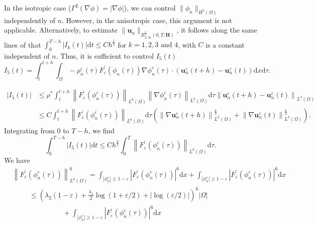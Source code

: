 \documentclass[11pt]{article}
\def\bfH{\mathbf{H}}
\def\bfu{\mathbf{u}}
\def\md{\mathrm{d}}
\def\Om{\Omega}
\begin{document}
In the isotropic case ($\Gamma^2(\nabla\phi) = |\nabla\phi|$), we can control $\|\phi_n^{}\|_{H^2(\Omega)}$ independently of $n$. However, in the anisotropic case, this argument is not applicable. Alternatively, to estimate $\|\bfu_n^{}\|_{B_{2,\infty}^{\frac{1}{4}}(0,T;\bfH)}$,
it follows along the same lines of \cite[page 210]{giorgini2020weak}  that 
$\int_{0}^{T-h} |I_k(t)| \md t \leq C h^{\frac{1}{2}}$ for $k=1,2,3\text{ and } 4$, with $C$ is a constant independent of $n$. Thus, it is sufficient to control $I_5(t)$
$$
I_5(t) = \int_t^{t+h} \int_{\Omega}-\rho_n^{\varepsilon}(\tau) F_{\varepsilon}^{\prime}\left(\phi_n(\tau)\right) \nabla \phi_n^{\varepsilon}(\tau) \cdot\left(\bfu^{\varepsilon}_n(t+h)-\bfu^{\varepsilon}_n(t)\right) \md x \md \tau.$$

$$
\begin{aligned}
\left|I_5(t)\right| & \leq \rho^* \int_t^{t+h}\left\|F_{\varepsilon}^{\prime}\left(\phi_n^{\varepsilon}(\tau)\right)\right\|_{L^6(\Omega)}\left\|\nabla \phi_n^{\varepsilon}(\tau)\right\|_{L^2(\Omega)} \md \tau\left\|\bfu^{\varepsilon}_n(t+h)-\bfu^{\varepsilon}_n(t)\right\|_{L^3(\Omega)} \\
& \leq C\int_t^{t+h}\left\|F_{\varepsilon}^{\prime}\left(\phi_n^{\varepsilon}(\tau)\right)\right\|_{L^6(\Omega)} \mathrm{d} \tau\left(\left\|\nabla \bfu^{\varepsilon}_n(t+h)\right\|_{L^2(\Omega)}^{\frac{1}{2}}+\left\|\nabla \bfu^{\varepsilon}_n(t)\right\|_{L^2(\Omega)}^{\frac{1}{2}}\right) .
\end{aligned}
$$
Integrating from $0$ to $T-h$, we find
$$
\int_0^{T-h}\left|I_5(t)\right| \mathrm{d} t \leq C h^{\frac{3}{4}} \int_0^T\left\|F_{\varepsilon}^{\prime}\left(\phi_n^{\varepsilon}(\tau)\right)\right\|_{L^6(\Omega)} \mathrm{d} \tau.
$$
We have 
\begin{align*}
&\left\|F_{\varepsilon}^{\prime}\left(\phi_n^{\varepsilon}(\tau)\right)\right\|^6_{L^6(\Omega)} = \int_{|\phi_n^{\varepsilon}|\leq 1-\varepsilon}|F_{\varepsilon}^{\prime}\left(\phi_n^{\varepsilon}(\tau)\right)|^6 \md x + \int_{|\phi_n^{\varepsilon}|\geq 1-\varepsilon}|F_{\varepsilon}^{\prime}\left(\phi_n^{\varepsilon}(\tau)\right)|^6 \md x\\
&\hspace{1cm}\leq \left({\lambda_2}(1-\varepsilon) + \frac{\lambda_1}{2}\log(1+\varepsilon/2) + |\log(\varepsilon/2)|\right)^6 |\Om|  \\
&\hspace{3cm}+\int_{|\phi_n^{\varepsilon}|\geq 1-\varepsilon}|F_{\varepsilon}^{\prime}\left(\phi_n^{\varepsilon}(\tau)\right)|^6 \md x
\end{align*}
\end{document}
